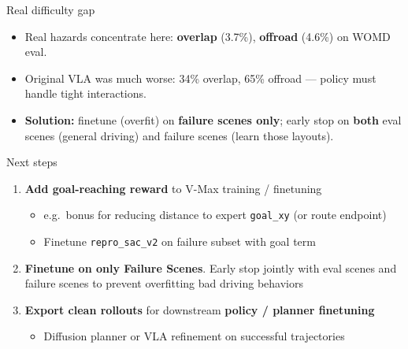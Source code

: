 \documentclass[aspectratio=169,11pt]{beamer}
\begin{document}
\begin{frame}{Real difficulty gap}
  \centering

  \vspace{0.8em}
  \begin{itemize}
    \item Real hazards concentrate here: \textbf{overlap} (3.7\%), \textbf{offroad} (4.6\%) on WOMD eval.
    \item Original VLA was much worse: 34\% overlap, 65\% offroad --- policy must handle tight interactions.
    \item \textbf{Solution:} finetune (overfit) on \textbf{failure scenes only}; early stop on \textbf{both}
          eval scenes (general driving) and failure scenes (learn those layouts).
  \end{itemize}
\end{frame}

\begin{frame}{Next steps}
  \begin{enumerate}
    \item \textbf{Add goal-reaching reward} to V-Max training / finetuning
    \begin{itemize}
      \item e.g.\ bonus for reducing distance to expert \texttt{goal\_xy} (or route endpoint)
      \item Finetune \texttt{repro\_sac\_v2} on failure subset with goal term
    \end{itemize}
    \item \textbf{Finetune on only Failure Scenes}. Early stop jointly with eval scenes and failure scenes to prevent overfitting bad driving behaviors
    \item \textbf{Export clean rollouts} for downstream \textbf{policy / planner finetuning}
    \begin{itemize}
      \item Diffusion planner or VLA refinement on successful trajectories
    \end{itemize}
  \end{enumerate}

\end{frame}
\end{document}
